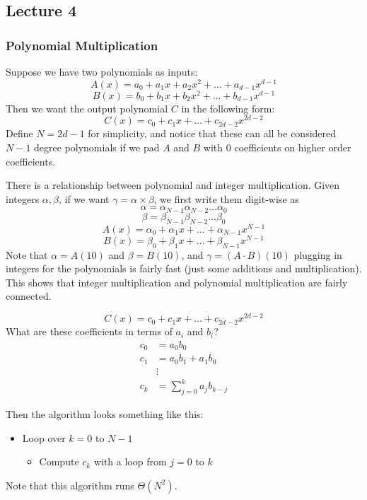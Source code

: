 \subsection{Lecture 4}

\subsubsection{Polynomial Multiplication}
Suppose we have two polynomials as inputs:
\[ A(x) = a_0 + a_1x + a_2x^2 + \dots + a_{d-1}x^{d-1} \]
\[ B(x) = b_0 + b_1x + b_2x^2 + \dots + b_{d-1}x^{d-1} \]
Then we want the output polynomial $C$ in the following form:
\[ C(x) = c_0 + c_1x + \dots + c_{2d - 2}x^{2d - 2} \]
Define $N = 2d - 1$ for simplicity, and notice that these can all be considered $N - 1$ degree polynomials
if we pad $A$ and $B$ with 0 coefficients on higher order coefficients.

There is a relationship between polynomial and integer multiplication.
Given integers $\alpha, \beta$, if we want $\gamma = \alpha \times \beta$, we first write them digit-wise as
\[ \alpha = \alpha_{N - 1} \alpha_{N-2} \dots \alpha_0 \]
\[ \beta = \beta_{N - 1} \beta_{N-2} \dots \beta_0\]
\[ A(x) = \alpha_0 + \alpha_1 x + \dots + \alpha_{N-1}x^{N-1} \]
\[ B(x) = \beta_0+ \beta_1x + \dots + \beta_{N-1}x^{N-1} \]
Note that $\alpha = A(10)$ and $\beta = B(10)$, and $\gamma = (A \cdot B)(10)$
plugging in integers for the polynomials is fairly fast (just some additions and multiplication).
This shows that integer multiplication and polynomial multiplication are fairly connected.

\begin{algothm} 
    \[ C(x) = c_0 + c_1x + \dots + c_{2d - 2}x^{2d - 2} \]
    What are these coefficients in terms of $a_i$ and $b_i$?
    \begin{align*} 
        c_0 &= a_0 b_0 \\
        c_1 &= a_0 b_1 + a_1 b_0 \\
        &\vdots \\
        c_k &= \sum_{j = 0}^k a_j b_{k - j}
    \end{align*}

    Then the algorithm looks something like this:
    \begin{itemize}
        \item Loop over $k = 0$ to $N - 1$
        \begin{itemize}
            \item Compute $c_k$ with a loop from $j = 0$ to $k$
        \end{itemize}
    \end{itemize}

    Note that this algorithm runs $\Theta(N^2)$.
\end{algothm}

